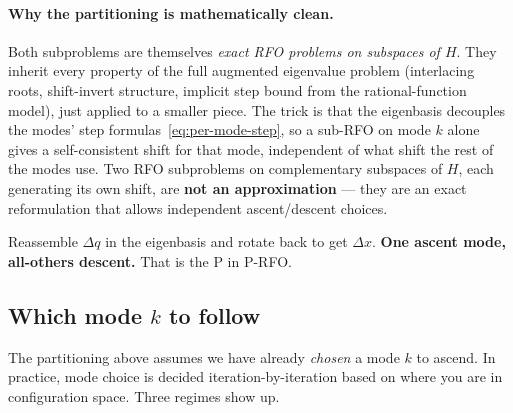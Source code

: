 \documentclass[11pt]{article}
\newcommand{\dx}{\Delta x}
\newcommand{\dq}{\Delta q}
\begin{document}
\paragraph{Why the partitioning is mathematically clean.}  Both subproblems
are themselves \emph{exact RFO problems on subspaces of $H$}.  They inherit
every property of the full augmented eigenvalue problem (interlacing roots,
shift-invert structure, implicit step bound from the rational-function
model), just applied to a smaller piece.  The trick is that the eigenbasis
decouples the modes' step formulas~\eqref{eq:per-mode-step}, so a sub-RFO
on mode $k$ alone gives a self-consistent shift for that mode, independent
of what shift the rest of the modes use.  Two RFO subproblems on
complementary subspaces of $H$, each generating its own shift, are
\textbf{not an approximation} --- they are an exact reformulation that
allows independent ascent/descent choices.

Reassemble $\dq$ in the eigenbasis and rotate back to get $\dx$.  \textbf{One
ascent mode, all-others descent.}  That is the P in P-RFO.

\subsection*{Which mode $k$ to follow}

The partitioning above assumes we have already \emph{chosen} a mode $k$ to
ascend.  In practice, mode choice is decided iteration-by-iteration based on
where you are in configuration space.  Three regimes show up.
\end{document}
